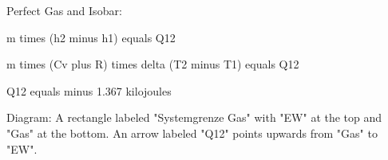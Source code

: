 Perfect Gas and Isobar:

m times (h2 minus h1) equals Q12

m times (Cv plus R) times delta (T2 minus T1) equals Q12

Q12 equals minus 1.367 kilojoules

Diagram: A rectangle labeled "Systemgrenze Gas" with "EW" at the top and "Gas" at the bottom. An arrow labeled "Q12" points upwards from "Gas" to "EW".